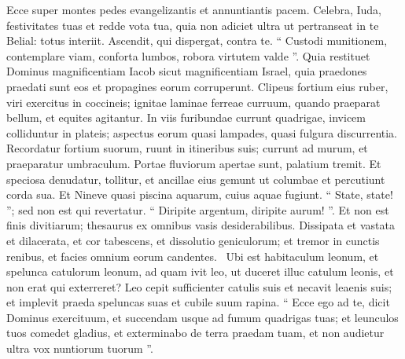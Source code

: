 \begin{biblechapter}
\begin{biblechapter}
 \verse Ecce super montes pedes evangelizantis
 et annuntiantis pacem.
 Celebra, Iuda, festivitates tuas
 et redde vota tua,
 quia non adiciet ultra ut pertranseat in te Belial:
 totus interiit.
 \verse Ascendit, qui dispergat, contra te.
 “ Custodi munitionem,
 contemplare viam, conforta lumbos, robora virtutem valde ”.
 \verse Quia restituet Dominus magnificentiam Iacob
 sicut magnificentiam Israel,
 quia praedones praedati sunt eos
 et propagines eorum corruperunt.
 \verse Clipeus fortium eius ruber,
 viri exercitus in coccineis;
 ignitae laminae ferreae curruum,
 quando praeparat bellum,
 et equites agitantur.
 \verse In viis furibundae currunt quadrigae,
 invicem colliduntur in plateis;
 aspectus eorum quasi lampades,
 quasi fulgura discurrentia.
 \verse Recordatur fortium suorum,
 ruunt in itineribus suis;
 currunt ad murum,
 et praeparatur umbraculum.
 \verse Portae fluviorum apertae sunt,
 palatium tremit.
 \verse Et speciosa denudatur, tollitur,
 et ancillae eius gemunt ut columbae et percutiunt corda sua.
 \verse Et Nineve quasi piscina aquarum,
 cuius aquae fugiunt.
 “ State, state! ”;
 sed non est qui revertatur.
 \verse “ Diripite argentum, diripite aurum! ”.
 Et non est finis divitiarum;
 thesaurus ex omnibus vasis desiderabilibus.
 \verse Dissipata et vastata et dilacerata,
 et cor tabescens,
 et dissolutio geniculorum;
 et tremor in cunctis renibus,
 et facies omnium eorum candentes. 
 \verse Ubi est habitaculum leonum,
 et spelunca catulorum leonum,
 ad quam ivit leo, ut duceret illuc catulum leonis,
 et non erat qui exterreret?
 \verse Leo cepit sufficienter catulis suis
 et necavit leaenis suis;
 et implevit praeda speluncas suas
 et cubile suum rapina.
 \verse “ Ecce ego ad te,
 dicit Dominus exercituum,
 et succendam usque ad fumum quadrigas tuas;
 et leunculos tuos comedet gladius,
 et exterminabo de terra praedam tuam,
 et non audietur ultra vox nuntiorum tuorum ”.
 

\end{biblechapter}
\end{biblechapter}
